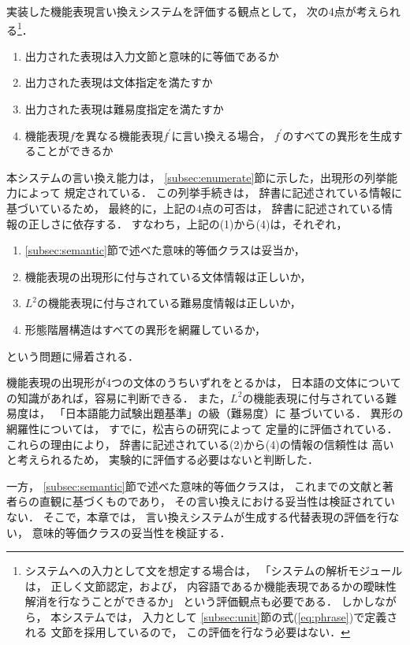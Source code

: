 \documentclass[japanese]{jnlp_1.4}
\begin{document}
実装した機能表現言い換えシステムを評価する観点として，
次の4点が考えられる\footnote{
	システムへの入力として文を想定する場合は，
	「システムの解析モジュールは，
	正しく文節認定，および，
	内容語であるか機能表現であるかの曖昧性解消を行なうことができるか」
	という評価観点も必要である．
	しかしながら，
	本システムでは，
	入力として
	\ref{subsec:unit}節の式(\ref{eq:phrase})で定義される
	文節を採用しているので，
	この評価を行なう必要はない．
}．
\begin{enumerate}
\item 出力された表現は入力文節と意味的に等価であるか
\item 出力された表現は文体指定を満たすか
\item 出力された表現は難易度指定を満たすか
\item 機能表現$f$を異なる機能表現$f^\prime$に言い換える場合，
      $f^\prime$のすべての異形を生成することができるか
\end{enumerate}
本システムの言い換え能力は，
\ref{subsec:enumerate}節に示した，出現形の列挙能力によって
規定されている．
この列挙手続きは，
辞書に記述されている情報に基づいているため，
最終的に，上記の4点の可否は，
辞書に記述されている情報の正しさに依存する．
すなわち，上記の(1)から(4)は，それぞれ，
\begin{enumerate}
\item \ref{subsec:semantic}節で述べた意味的等価クラスは妥当か，
\item 機能表現の出現形に付与されている文体情報は正しいか，
\item $L^2$の機能表現に付与されている難易度情報は正しいか，
\item 形態階層構造はすべての異形を網羅しているか，
\end{enumerate}
という問題に帰着される．

機能表現の出現形が4つの文体のうちいずれをとるかは，
日本語の文体についての知識があれば，容易に判断できる．
また，$L^2$の機能表現に付与されている難易度は，
「日本語能力試験出題基準」の級（難易度）に
基づいている．
異形の網羅性については，
すでに，松吉らの研究によって
定量的に評価されている．
これらの理由により，
辞書に記述されている(2)から(4)の情報の信頼性は
高いと考えられるため，
実験的に評価する必要はないと判断した．

一方，
\ref{subsec:semantic}節で述べた意味的等価クラスは，
これまでの文献と著者らの直観に基づくものであり，
その言い換えにおける妥当性は検証されていない．
そこで，本章では，
言い換えシステムが生成する代替表現の評価を行ない，
意味的等価クラスの妥当性を検証する．
\end{document}
